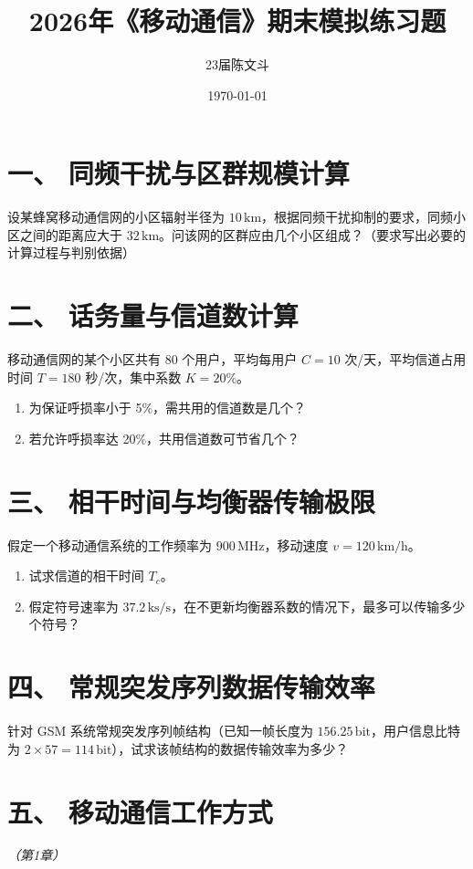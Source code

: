 \documentclass[12pt, a4paper]{ctexart}
\title{\textbf{\Huge 2026年《移动通信》期末模拟练习题}}
\author{23届陈文斗}
\date{\today}
\begin{document}
\maketitle

\section*{一、 同频干扰与区群规模计算}
设某蜂窝移动通信网的小区辐射半径为 $10\,\text{km}$，根据同频干扰抑制的要求，同频小区之间的距离应大于 $32\,\text{km}$。问该网的区群应由几个小区组成？（要求写出必要的计算过程与判别依据）

\vfill

\section*{二、 话务量与信道数计算}
移动通信网的某个小区共有 80 个用户，平均每用户 $C=10$ 次/天，平均信道占用时间 $T=180$ 秒/次，集中系数 $K=20\%$。
\begin{enumerate}[label=(\arabic*)]
    \item 为保证呼损率小于 5\%，需共用的信道数是几个？
    \item 若允许呼损率达 20\%，共用信道数可节省几个？
\end{enumerate}

\vfill
\newpage

\section*{三、 相干时间与均衡器传输极限}
假定一个移动通信系统的工作频率为 $900\,\text{MHz}$，移动速度 $v = 120\,\text{km/h}$。
\begin{enumerate}[label=(\arabic*)]
    \item 试求信道的相干时间 $T_c$。
    \item 假定符号速率为 $37.2\,\text{ks/s}$，在不更新均衡器系数的情况下，最多可以传输多少个符号？
\end{enumerate}

\vfill

\section*{四、 常规突发序列数据传输效率}
针对 GSM 系统常规突发序列帧结构（已知一帧长度为 $156.25\,\text{bit}$，用户信息比特为 $2 \times 57 = 114\,\text{bit}$），试求该帧结构的数据传输效率为多少？

\vfill
\newpage

\section*{五、 移动通信工作方式}
\textit{（第1章）}
\end{document}
